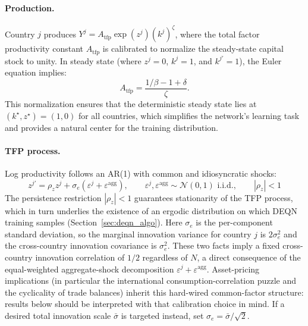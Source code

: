 \documentclass[11pt,a4paper]{report}
\begin{document}
\paragraph{Production.}  Country $j$ produces $Y^j = A_\mathrm{tfp} \exp(z^j)(k^j)^\zeta$, where the total factor productivity constant $A_\mathrm{tfp}$ is calibrated to normalize the steady-state capital stock to unity.  In steady state (where $z^j = 0$, $k^j = 1$, and $k^{j\prime} = 1$), the Euler equation implies:
\begin{equation}
A_\mathrm{tfp} = \frac{1/\beta - 1 + \delta}{\zeta}.
\label{eq:atfp}
\end{equation}
This normalization ensures that the deterministic steady state lies at $(k^\star, z^\star) = (1, 0)$ for all countries, which simplifies the network's learning task and provides a natural center for the training distribution.

\paragraph{TFP process.}  Log productivity follows an AR(1) with common and idiosyncratic shocks:
\begin{equation}
z^{j\prime} = \rho_z z^j + \sigma_e(\varepsilon^j + \varepsilon^\mathrm{agg}), \qquad \varepsilon^j, \varepsilon^\mathrm{agg} \sim \mathcal{N}(0,1)\text{ i.i.d.}, \qquad |\rho_z| < 1
\label{eq:irbc_tfp}
\end{equation}
The persistence restriction $|\rho_z|<1$ guarantees stationarity of the TFP process, which in turn underlies the existence of an ergodic distribution on which DEQN training samples (Section~\ref{sec:deqn_algo}).  Here $\sigma_e$ is the per-component standard deviation, so the marginal innovation variance for country $j$ is $2\sigma_e^2$ and the cross-country innovation covariance is $\sigma_e^2$.  These two facts imply a fixed cross-country innovation correlation of $1/2$ regardless of $N$, a direct consequence of the equal-weighted aggregate-shock decomposition $\varepsilon^j + \varepsilon^\mathrm{agg}$.  Asset-pricing implications (in particular the international consumption-correlation puzzle and the cyclicality of trade balances) inherit this hard-wired common-factor structure: results below should be interpreted with that calibration choice in mind.  If a desired total innovation scale $\bar\sigma$ is targeted instead, set $\sigma_e = \bar\sigma/\sqrt{2}$.
\end{document}
